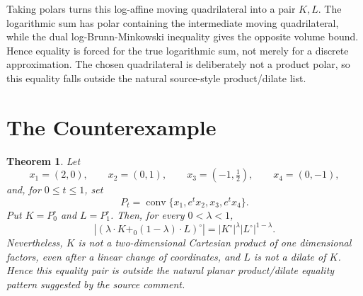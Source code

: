 \documentclass[11pt]{article}
\newtheorem{theorem}{Theorem}
\newcommand{\conv}{\operatorname{conv}}
\newcommand{\polar}{^\circ}
\begin{document}
Taking polars turns this log-affine moving quadrilateral into a pair
\(K,L\).  The logarithmic sum has polar containing the intermediate moving
quadrilateral, while the dual log-Brunn-Minkowski inequality gives the
opposite volume bound.  Hence equality is forced for the true logarithmic sum,
not merely for a discrete approximation.  The chosen quadrilateral is
deliberately not a product polar, so this equality falls outside the natural
source-style product/dilate list.

\section*{The Counterexample}

\begin{theorem}
Let
\[
 x_1=(2,0),\qquad x_2=(0,1),\qquad
 x_3=(-1,\tfrac12),\qquad x_4=(0,-1),
\]
and, for \(0\leq t\leq 1\), set
\[
   P_t=\conv\{x_1,e^t x_2,x_3,e^t x_4\}.
\]
Put \(K=P_0\polar\) and \(L=P_1\polar\).  Then, for every
\(0<\lambda<1\),
\[
 \left|(\lambda\cdot K+_0(1-\lambda)\cdot L)\polar\right|
 =
 |K\polar|^\lambda |L\polar|^{1-\lambda}.
\]
Nevertheless, \(K\) is not a two-dimensional Cartesian product of one
dimensional factors, even after a linear change of coordinates, and \(L\) is
not a dilate of \(K\).  Hence this equality pair is outside the natural
planar product/dilate equality pattern suggested by the source comment.
\end{theorem}
\end{document}
